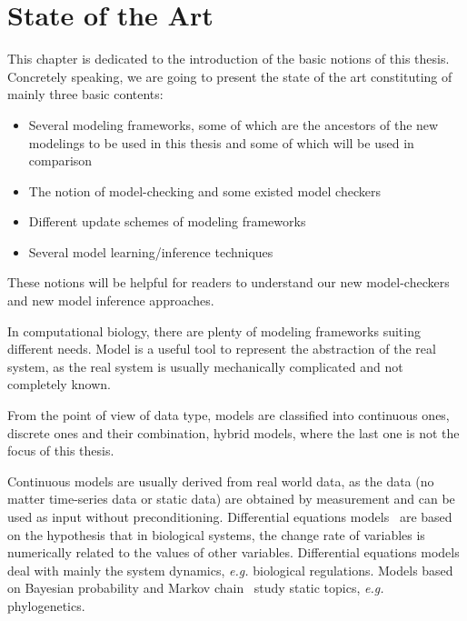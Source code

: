 \chapter{State of the Art}\label{chap:stateOfTheArt}

\begin{mybox}
This chapter is dedicated to the introduction of the basic notions of this thesis.
Concretely speaking, we are going to present the state of the art constituting of mainly three basic contents:

\begin{itemize}
    \item Several modeling frameworks, some of which are the ancestors of the new modelings to be used in this thesis and some of which will be used in comparison
    \item The notion of model-checking and some existed model checkers 
    \item Different update schemes of modeling frameworks
    \item Several model learning/inference techniques
\end{itemize}

These notions will be helpful for readers to understand our new model-checkers and new model inference approaches.
\end{mybox}

In computational biology, there are plenty of modeling frameworks suiting different needs.
Model is a useful tool to represent the abstraction of the real system, as the real system is usually mechanically complicated and not completely known.

From the point of view of data type, models are classified into continuous ones, discrete ones and their combination, hybrid models, where the last one is not the focus of this thesis.

Continuous models are usually derived from real world data, as the data (no matter time-series data or static data) are obtained by measurement and can be used as input without preconditioning.
Differential equations models~\cite{glass1973logical,snoussi1989qualitative,thomas1990biological} are based on the hypothesis that in biological systems, the change rate of variables is numerically related to the values of other variables. 
Differential equations models deal with mainly the system dynamics, \textit{e.g.} biological regulations.
Models based on Bayesian probability and Markov chain~\cite{huelsenbeck2001mrbayes,larget1999markov} study static topics, \textit{e.g.} phylogenetics.

